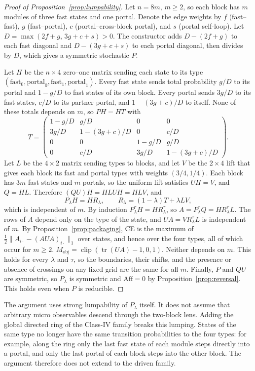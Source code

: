 \begin{proof}[Proof of Proposition~\ref{prop:lumpability}]
Let $n=8m$, $m\ge2$, so each block has $m$ modules of three fast states and one portal. Denote the edge weights by $f$ (fast--fast), $g$ (fast--portal), $c$ (portal--cross-block portal), and $s$ (portal self-loop). Let $D=\max(2f+g,\,3g+c+s)>0$. The constructor adds $D-(2f+g)$ to each fast diagonal and $D-(3g+c+s)$ to each portal diagonal, then divides by $D$, which gives a symmetric stochastic $P$.

Let $H$ be the $n\times4$ zero--one matrix sending each state to its type $(\text{fast}_0,\text{portal}_0,\text{fast}_1,\text{portal}_1)$. Every fast state sends total probability $g/D$ to its portal and $1-g/D$ to fast states of its own block. Every portal sends $3g/D$ to its fast states, $c/D$ to its partner portal, and $1-(3g+c)/D$ to itself. None of these totals depends on $m$, so $PH=HT$ with
\[
T=\begin{pmatrix}
1-g/D & g/D & 0 & 0\\
3g/D & 1-(3g+c)/D & 0 & c/D\\
0 & 0 & 1-g/D & g/D\\
0 & c/D & 3g/D & 1-(3g+c)/D
\end{pmatrix}.
\]
Let $L$ be the $4\times2$ matrix sending types to blocks, and let $V$ be the $2\times4$ lift that gives each block its fast and portal types with weights $(3/4,1/4)$. Each block has $3m$ fast states and $m$ portals, so the uniform lift satisfies $UH=V$, and $Q=HL$. Therefore $(QU)H=HLUH=HLV$, and
\[
P_\lambda H=H R_\lambda,\qquad R_\lambda=(1-\lambda)T+\lambda LV,
\]
which is independent of $m$. By induction $P_\lambda^{\tau}H=HR_\lambda^{\tau}$, so $A=P_\lambda^{\tau}Q=HR_\lambda^{\tau}L$. The rows of $A$ depend only on the type of the state, and $UA=VR_\lambda^{\tau}L$ is independent of $m$. By Proposition~\ref{prop:packaging}, CE is the maximum of $\tfrac12\|A_{i\cdot}-(AUA)_{i\cdot}\|_1$ over states, and hence over the four types, all of which occur for $m\ge2$. $M_{\mathrm{obj}}=\operatorname{clip}(\operatorname{tr}(UA)-1,0,1)$. Neither depends on $m$. This holds for every $\lambda$ and $\tau$, so the boundaries, their shifts, and the presence or absence of crossings on any fixed grid are the same for all $m$. Finally, $P$ and $QU$ are symmetric, so $P_\lambda$ is symmetric and $\mathrm{Aff}=0$ by Proposition~\ref{prop:reversal}. This holds even when $P$ is reducible.
\end{proof}

\begin{remark}
The argument uses strong lumpability of $P_\lambda$ itself. It does not assume that arbitrary micro observables descend through the two-block lens. Adding the global directed ring of the Class-IV family breaks this lumping. States of the same type no longer have the same transition probabilities to the four types: for example, along the ring only the last fast state of each module steps directly into a portal, and only the last portal of each block steps into the other block. The argument therefore does not extend to the driven family.
\end{remark}
